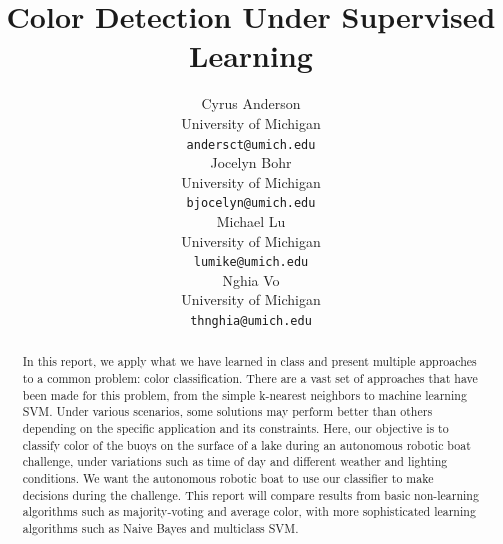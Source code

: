 \documentclass{article} %
\title{Color Detection Under Supervised Learning}
\author{
Cyrus Anderson \\
University of Michigan \\
\texttt{andersct@umich.edu} \\
\And
Jocelyn Bohr \\
University of Michigan \\
\texttt{bjocelyn@umich.edu} \\
\AND
Michael Lu \\
University of Michigan \\
\texttt{lumike@umich.edu} \\
\And
Nghia Vo \\
University of Michigan \\
\texttt{thnghia@umich.edu} \\
}
\begin{document}
\maketitle

\begin{abstract}
In this report, we apply what we have learned in class and present multiple approaches to a common problem: color classification. There are a vast set of approaches that have been made for this problem, from the simple k-nearest neighbors to machine learning SVM. Under various scenarios, some solutions may perform better than others depending on the specific application and its constraints. Here, our objective is to classify color of the buoys on the surface of a lake during an autonomous robotic boat challenge, under variations such as time of day and different weather and lighting conditions. We want the autonomous robotic boat to use our classifier to make decisions during the challenge. This report will compare results from basic non-learning algorithms such as majority-voting and average color, with more sophisticated learning algorithms such as Naive Bayes and multiclass SVM. 
\end{abstract}
\end{document}
